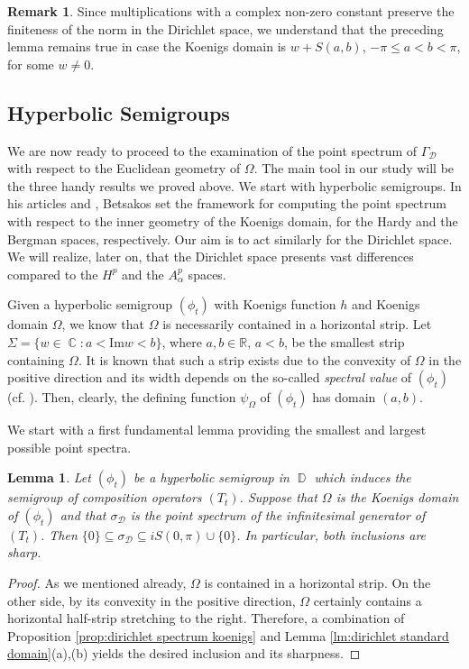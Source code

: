 \documentclass[11pt]{amsart}
\numberwithin{equation}{section}
\newtheorem{lemma}[theorem]{Lemma}
\theoremstyle{definition}
\newtheorem{remark}[theorem]{Remark}
\DeclareMathOperator{\C}{\mathbb{C}}
\DeclareMathOperator{\D}{\mathbb{D}}
\begin{document}
	\begin{remark}\label{rem:dirichlet sectors}
		Since multiplications with a complex non-zero constant preserve the finiteness of the norm in the Dirichlet space, we understand that the preceding lemma remains true in case the Koenigs domain is $w+S(a,b)$, $-\pi\le a<b<\pi$, for some $w\ne0$.
	\end{remark}
	
	
	
	
	\subsection{Hyperbolic Semigroups}
	
	We are now ready to proceed to the examination of the point spectrum of $\Gamma_\mathcal{D}$ with respect to the Euclidean geometry of $\Omega$. The main tool in our study will be the three handy results we proved above. We start with hyperbolic semigroups. In his articles \cite{betsakos_eig} and \cite{Betsakos_Bergman}, Betsakos set the framework for computing the point spectrum with respect to the inner geometry of the Koenigs domain, for the Hardy and the Bergman spaces, respectively. Our aim is to act similarly for the Dirichlet space. We will realize, later on, that the Dirichlet space presents vast differences compared to the $H^p$ and the $A_\alpha^p$ spaces.
	
	Given a hyperbolic semigroup $(\phi_t)$ with Koenigs function $h$ and Koenigs domain $\Omega$, we know that $\Omega$ is necessarily contained in a horizontal strip. Let $\Sigma=\{w\in\C:a<\mathrm{Im}w<b\}$, where $a,b\in\mathbb{R}$, $a<b$, be the smallest strip containing $\Omega$. It is known that such a strip exists due to the convexity of $\Omega$ in the positive direction and its width depends on the so-called \textit{spectral value} of $(\phi_t)$ (cf. \cite[Theorem 9.4.10]{Booksem}). Then, clearly, the defining function $\psi_\Omega$ of $(\phi_t)$ has domain $(a,b)$.
	
	We start with a first fundamental lemma providing the smallest and largest possible point spectra.
	
	\begin{lemma}\label{lm:hyperbolic basic condition}
		Let $(\phi_t)$ be a hyperbolic semigroup in $\D$ which induces the semigroup of composition operators $(T_t)$. Suppose that $\Omega$ is the Koenigs domain of $(\phi_t)$ and that $\sigma_\mathcal{D}$ is the point spectrum of the infinitesimal generator of $(T_t)$. Then $\{0\}\subseteq\sigma_{\mathcal{D}}\subseteq iS(0,\pi)\cup\{0\}$. In particular, both inclusions are sharp.
	\end{lemma}
	\begin{proof}
		As we mentioned already, $\Omega$ is contained in a horizontal strip. On the other side, by its convexity in the positive direction, $\Omega$ certainly contains a horizontal half-strip stretching to the right. Therefore, a combination of Proposition \ref{prop:dirichlet spectrum koenigs} and Lemma \ref{lm:dirichlet standard domain}(a),(b) yields the desired inclusion and its sharpness. 
	\end{proof}
	
\end{document}
